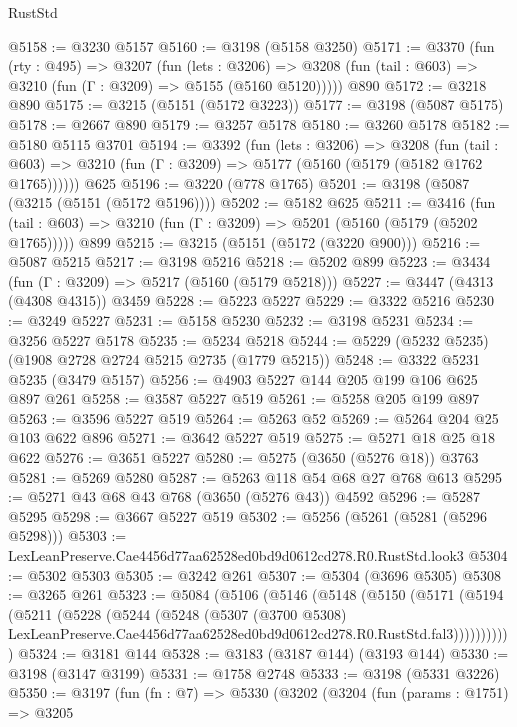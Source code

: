 \begin{lexlean}{RustStd}
\begin{coremodule}
@5158 := @3230 @5157
@5160 := @3198 (@5158 @3250)
@5171 := @3370
    (fun (rty : @495) =>
    @3207
      (fun (lets : @3206) =>
      @3208 (fun (tail : @603) => @3210 (fun (Γ : @3209) => @5155 (@5160 @5120)))))
    @890
@5172 := @3218 @890
@5175 := @3215 (@5151 (@5172 @3223))
@5177 := @3198 (@5087 @5175)
@5178 := @2667 @890
@5179 := @3257 @5178
@5180 := @3260 @5178
@5182 := @5180 @5115 @3701
@5194 := @3392
    (fun (lets : @3206) =>
    @3208
      (fun (tail : @603) => @3210 (fun (Γ : @3209) => @5177 (@5160 (@5179 (@5182 @1762 @1765))))))
    @625
@5196 := @3220 (@778 @1765)
@5201 := @3198 (@5087 (@3215 (@5151 (@5172 @5196))))
@5202 := @5182 @625
@5211 := @3416
    (fun (tail : @603) => @3210 (fun (Γ : @3209) => @5201 (@5160 (@5179 (@5202 @1765)))))
    @899
@5215 := @3215 (@5151 (@5172 (@3220 @900)))
@5216 := @5087 @5215
@5217 := @3198 @5216
@5218 := @5202 @899
@5223 := @3434 (fun (Γ : @3209) => @5217 (@5160 (@5179 @5218)))
@5227 := @3447 (@4313 (@4308 @4315)) @3459
@5228 := @5223 @5227
@5229 := @3322 @5216
@5230 := @3249 @5227
@5231 := @5158 @5230
@5232 := @3198 @5231
@5234 := @3256 @5227 @5178
@5235 := @5234 @5218
@5244 := @5229 (@5232 @5235) (@1908 @2728 @2724 @5215 @2735 (@1779 @5215))
@5248 := @3322 @5231 @5235 (@3479 @5157)
@5256 := @4903 @5227 @144 @205 @199 @106 @625 @897 @261
@5258 := @3587 @5227 @519
@5261 := @5258 @205 @199 @897
@5263 := @3596 @5227 @519
@5264 := @5263 @52
@5269 := @5264 @204 @25 @103 @622 @896
@5271 := @3642 @5227 @519
@5275 := @5271 @18 @25 @18 @622
@5276 := @3651 @5227
@5280 := @5275 (@3650 (@5276 @18)) @3763
@5281 := @5269 @5280
@5287 := @5263 @118 @54 @68 @27 @768 @613
@5295 := @5271 @43 @68 @43 @768 (@3650 (@5276 @43)) @4592
@5296 := @5287 @5295
@5298 := @3667 @5227 @519
@5302 := @5256 (@5261 (@5281 (@5296 @5298)))
@5303 := LexLeanPreserve.Cae4456d77aa62528ed0bd9d0612cd278.R0.RustStd.look3
@5304 := @5302 @5303
@5305 := @3242 @261
@5307 := @5304 (@3696 @5305)
@5308 := @3265 @261
@5323 := @5084
    (@5106
      (@5146
        (@5148
          (@5150
            (@5171
              (@5194
                (@5211
                  (@5228
                    (@5244
                      (@5248
                        (@5307
                          (@3700 @5308)
                          LexLeanPreserve.Cae4456d77aa62528ed0bd9d0612cd278.R0.RustStd.fal3)))))))))))
@5324 := @3181 @144
@5328 := @3183 (@3187 @144) (@3193 @144)
@5330 := @3198 (@3147 @3199)
@5331 := @1758 @2748
@5333 := @3198 (@5331 @3226)
@5350 := @3197
    (fun (fn : @7) =>
    @5330
      (@3202
        (@3204
          (fun (params : @1751) =>
          @3205

\end{coremodule}
\end{lexlean}
